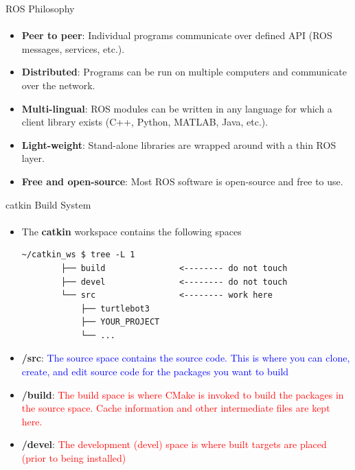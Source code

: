 \documentclass[aspectratio=169]{beamer}
\begin{document}
\begin{frame}{ROS Philosophy}
	\framesubtitle{}
	\begin{itemize}
		
		\item \textbf{Peer to peer}: Individual programs communicate over defined API (ROS messages, services, etc.).
		\item \textbf{Distributed}: Programs can be run on multiple computers and communicate over the network.
		\item \textbf{Multi-lingual}: ROS modules can be written in any language for which a client library exists (C++, Python, MATLAB, Java, etc.).
		\item \textbf{Light-weight}: Stand-alone libraries are wrapped around with a thin ROS layer.
		\item \textbf{Free and open-source}: Most ROS software is open-source and free to use.

	\end{itemize}
\end{frame}


\begin{frame}[fragile]{catkin Build System}
	\framesubtitle{ }
    \begin{itemize}
        \item The \textbf{catkin} workspace contains the following spaces

		\begin{lstlisting}[style=ascii-tree]
		~/catkin_ws $ tree -L 1
		├── build				<-------- do not touch
		├── devel				<-------- do not touch
		└── src					<-------- work here
			├── turtlebot3
			├── YOUR_PROJECT
			└── ...
		\end{lstlisting}

		\item \textbf{/src}: \textcolor{blue}{The source space contains the source code. This is where you can clone, create, and edit source code for the packages you want to build}
		\item \textbf{/build}: \textcolor{red}{The build space is where CMake is invoked to build the packages in the source space. Cache information and other intermediate files are kept here.}
		\item \textbf{/devel}: \textcolor{red}{The development (devel) space is where built targets are placed (prior to being installed)}
		\end{itemize}

\end{frame}
\end{document}
